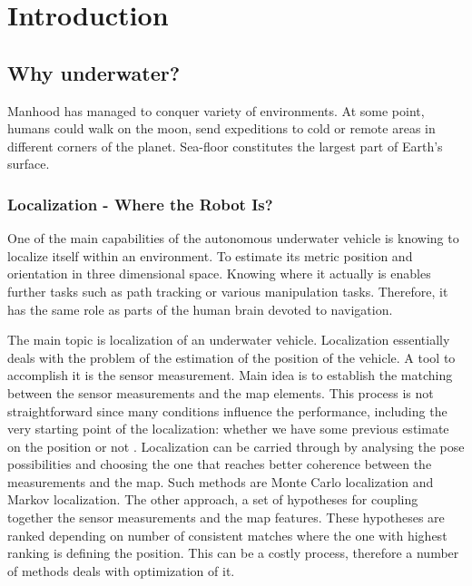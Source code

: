 \chapter{Introduction} \label{chap:intro}

\section{Why underwater?} \label{sect:thefirst}

Manhood has managed to conquer variety of environments. At some point, humans could walk on the moon, send expeditions to cold or remote areas in different corners of the planet. Sea-floor constitutes the largest part of Earth's surface.
\subsection{Localization - Where the Robot Is?}
One of the main capabilities of the autonomous underwater vehicle is knowing to localize itself within an environment. To estimate its metric position and orientation in three dimensional space. Knowing where it actually is enables further tasks such as path tracking or various manipulation tasks. Therefore, it has the same role as parts of the human brain devoted to navigation.  


The main topic is localization of an underwater vehicle. Localization essentially deals with the problem of the estimation of the position of the vehicle. A tool to accomplish it is the sensor measurement. Main idea is to establish the matching between the sensor measurements and the map elements. This process is not straightforward since many conditions influence the performance, including the very starting point of the localization: whether we have some previous estimate on the position or not \cite{ribas10}. Localization can be carried through by analysing the pose possibilities and choosing the one that reaches better coherence between the measurements and the map. Such methods are Monte Carlo localization and Markov localization. The other approach, a set of hypotheses for coupling together the sensor measurements and the map features. These hypotheses are ranked depending on number of consistent matches where the one with highest ranking is defining the position. This can be a costly process, therefore a number of methods deals with optimization of it. 


